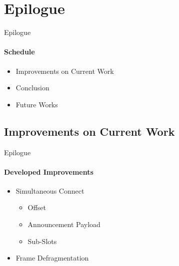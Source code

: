\section{Epilogue}
     \begin{frame}[t]{Epilogue}\framesubtitle{Schedule}
        \begin{itemize}
            \item Improvements on Current Work
            \item Conclusion
            \item Future Works
        \end{itemize}
    \end{frame}

    \subsection{Improvements on Current Work}
        \begin{frame}[t]{Epilogue}\framesubtitle{Developed Improvements}
                    \begin{itemize}
                        \item<1-4> Simultaneous Connect
                        \begin{itemize}
                                \item<2-4> Offset
                                \item<3-4> Announcement Payload
                                \item<4-4> Sub-Slots
                            \end{itemize}
                        \item<1> Frame Defragmentation

                    \end{itemize}
        \end{frame}

